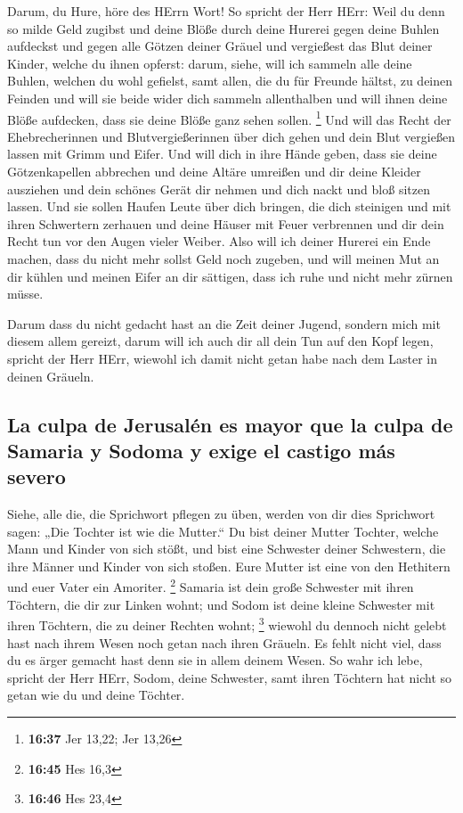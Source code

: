  Darum, du Hure, höre des HErrn Wort!  So
spricht der Herr HErr: Weil du denn so milde Geld zugibst und deine
Blöße durch deine Hurerei gegen deine Buhlen aufdeckst und gegen alle
Götzen deiner Gräuel und vergießest das Blut deiner Kinder, welche du
ihnen opferst:  darum, siehe, will ich sammeln alle deine
Buhlen, welchen du wohl gefielst, samt allen, die du für Freunde hältst,
zu deinen Feinden und will sie beide wider dich sammeln allenthalben und
will ihnen deine Blöße aufdecken, dass sie deine Blöße ganz sehen
sollen. \footnote{\textbf{16:37} Jer 13,22; Jer 13,26} 
Und will das Recht der Ehebrecherinnen und Blutvergießerinnen über dich
gehen und dein Blut vergießen lassen mit Grimm und Eifer.
 Und will dich in ihre Hände geben, dass sie deine
Götzenkapellen abbrechen und deine Altäre umreißen und dir deine Kleider
ausziehen und dein schönes Gerät dir nehmen und dich nackt und bloß
sitzen lassen.  Und sie sollen Haufen Leute über dich
bringen, die dich steinigen und mit ihren Schwertern zerhauen
 und deine Häuser mit Feuer verbrennen und dir dein Recht
tun vor den Augen vieler Weiber. Also will ich deiner Hurerei ein Ende
machen, dass du nicht mehr sollst Geld noch zugeben,  und
will meinen Mut an dir kühlen und meinen Eifer an dir sättigen, dass ich
ruhe und nicht mehr zürnen müsse.

 Darum dass du nicht gedacht hast an die Zeit deiner
Jugend, sondern mich mit diesem allem gereizt, darum will ich auch dir
all dein Tun auf den Kopf legen, spricht der Herr HErr, wiewohl ich
damit nicht getan habe nach dem Laster in deinen Gräueln.

\hypertarget{la-culpa-de-jerusaluxe9n-es-mayor-que-la-culpa-de-samaria-y-sodoma-y-exige-el-castigo-muxe1s-severo}{%
\subsection{La culpa de Jerusalén es mayor que la culpa de Samaria y
Sodoma y exige el castigo más
severo}\label{la-culpa-de-jerusaluxe9n-es-mayor-que-la-culpa-de-samaria-y-sodoma-y-exige-el-castigo-muxe1s-severo}}

 Siehe, alle die, die Sprichwort pflegen zu üben, werden
von dir dies Sprichwort sagen: „Die Tochter ist wie die Mutter.``
 Du bist deiner Mutter Tochter, welche Mann und Kinder
von sich stößt, und bist eine Schwester deiner Schwestern, die ihre
Männer und Kinder von sich stoßen. Eure Mutter ist eine von den
Hethitern und euer Vater ein Amoriter. \footnote{\textbf{16:45} Hes 16,3}
 Samaria ist dein große Schwester mit ihren Töchtern, die
dir zur Linken wohnt; und Sodom ist deine kleine Schwester mit ihren
Töchtern, die zu deiner Rechten wohnt; \footnote{\textbf{16:46} Hes 23,4}
 wiewohl du dennoch nicht gelebt hast nach ihrem Wesen
noch getan nach ihren Gräueln. Es fehlt nicht viel, dass du es ärger
gemacht hast denn sie in allem deinem Wesen.  So wahr ich
lebe, spricht der Herr HErr, Sodom, deine Schwester, samt ihren Töchtern
hat nicht so getan wie du und deine Töchter.

